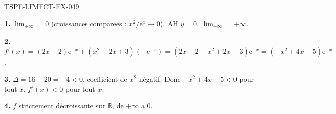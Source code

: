 \begin{corrige}{TSPE-LIMFCT-EX-049}

\textbf{1.} $\lim_{+\infty} = 0$ (croissances comparees : $x^2/\mathrm{e}^x \to 0$). AH $y = 0$. $\lim_{-\infty} = +\infty$.

\textbf{2.} $f'(x) = (2x-2)\mathrm{e}^{-x} + (x^2-2x+3)(-\mathrm{e}^{-x}) = (2x-2-x^2+2x-3)\mathrm{e}^{-x} = (-x^2+4x-5)\mathrm{e}^{-x}$.

\textbf{3.} $\Delta = 16-20 = -4 < 0$, coefficient de $x^2$ négatif. Donc $-x^2+4x-5 < 0$ pour tout $x$. $f'(x) < 0$ pour tout $x$.

\textbf{4.} $f$ strictement décroissante sur $\mathbb{R}$, de $+\infty$ a $0$.

\end{corrige}
